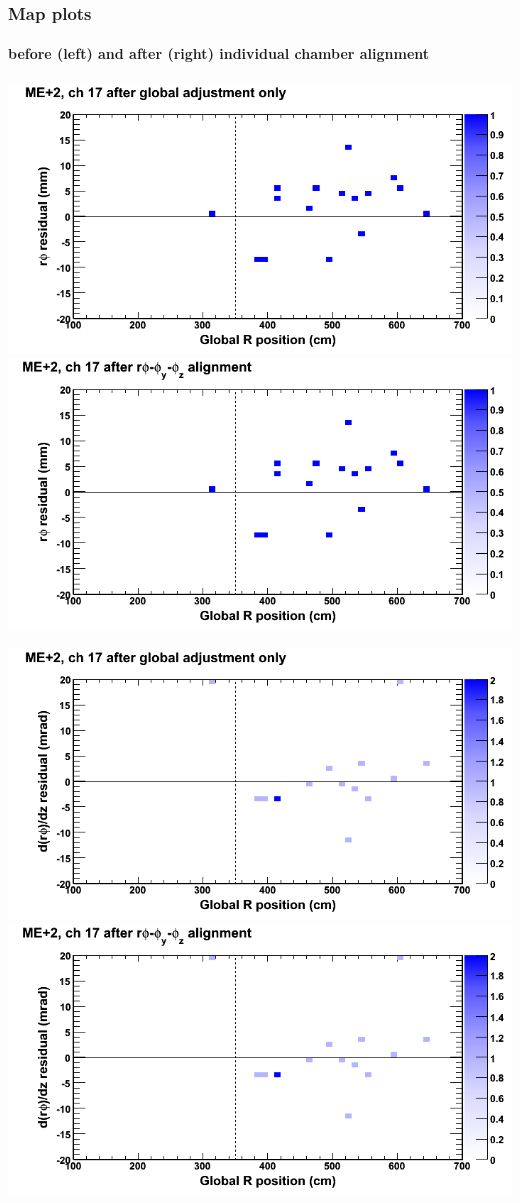 \documentclass[compress]{beamer}
\begin{document}
\begin{frame}
\frametitle{Map plots}
\framesubtitle{before (left) and after (right) individual chamber alignment}
\includegraphics[width=0.5\linewidth]{ringmapplots_3dof/before_CSCvsr_mep2ch17_x.png} \includegraphics[width=0.5\linewidth]{ringmapplots_3dof/after_CSCvsr_mep2ch17_x.png}

\includegraphics[width=0.5\linewidth]{ringmapplots_3dof/before_CSCvsr_mep2ch17_dxdz.png} \includegraphics[width=0.5\linewidth]{ringmapplots_3dof/after_CSCvsr_mep2ch17_dxdz.png}
\end{frame}
\end{document}
